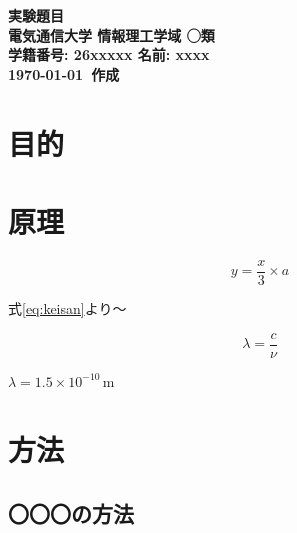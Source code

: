 \documentclass[a4paper,10pt]{ltjsarticle} %
\begin{document}
\begin{center} %
  {\huge \textbf{実験題目}} \\[1em] %
  {\large \textbf{電気通信大学 情報理工学域 ◯類}} \\ %
  {\large \textbf{学籍番号: 26xxxxx \quad 名前: xxxx}} \\[1em] %
  {\textbf{\today\ 作成}} %
\end{center}


\section{目的}


\section{原理}


\begin{equation} %
  y = \frac{x}{3} \times a %
  \label{eq:keisan} %
\end{equation}

式\eqref{eq:keisan}より～ %

\begin{equation*}
  \lambda = \frac{c}{\nu} %
\end{equation*} %

$\lambda = 1.5 \times 10^{-10} \, \mathrm{m}$ 


\section{方法}

\subsection{〇〇〇の方法}
\end{document}
